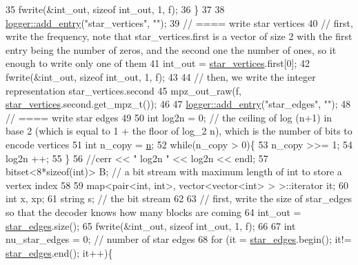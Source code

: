 \begin{DoxyCode}
35     fwrite(&int\_out, \textcolor{keyword}{sizeof} int\_out, 1, f);
36   \}
37 
38   \hyperlink{classlogger_a710163deb17bc81f70d53d285b8ac9ac}{logger::add\_entry}(\textcolor{stringliteral}{"star\_vertices"}, \textcolor{stringliteral}{""});
39   \textcolor{comment}{// ==== write star vertices}
40   \textcolor{comment}{// first, write the frequency, note that star\_vertices.first is a vector of size 2 with the first entry
       being the number of zeros, and the second one the number of ones, so it enough to write only one of them}
41   int\_out = \hyperlink{classmarked__graph__compressed_a7a4ced4586e2e353f9076bd447df5208}{star\_vertices}.first[0];
42   fwrite(&int\_out, \textcolor{keyword}{sizeof} int\_out, 1, f);
43 
44   \textcolor{comment}{// then, we write the integer representation star\_vertices.second}
45   mpz\_out\_raw(f, \hyperlink{classmarked__graph__compressed_a7a4ced4586e2e353f9076bd447df5208}{star\_vertices}.second.get\_mpz\_t());
46 
47   \hyperlink{classlogger_a710163deb17bc81f70d53d285b8ac9ac}{logger::add\_entry}(\textcolor{stringliteral}{"star\_edges"}, \textcolor{stringliteral}{""});
48   \textcolor{comment}{// ==== write star edges}
49 
50   \textcolor{keywordtype}{int} log2n = 0; \textcolor{comment}{// the ceiling of log (n+1) in base 2 (which is equal to 1 + the floor of log\_2 n), which
       is the number of bits to encode vertices}
51   \textcolor{keywordtype}{int} n\_copy = \hyperlink{classmarked__graph__compressed_a8d841016ddb11cfd33748c8deb6277ba}{n};
52   \textcolor{keywordflow}{while}(n\_copy > 0)\{
53     n\_copy >>= 1;
54     log2n ++;
55   \}
56   \textcolor{comment}{//cerr << " log2n " << log2n << endl;}
57   bitset<8*sizeof(int)> B; \textcolor{comment}{// a bit stream with maximum length of int to store a vertex index}
58 
59   map<pair<int, int>, vector<vector<int> > >::iterator it;
60   \textcolor{keywordtype}{int} x, xp;
61   \textcolor{keywordtype}{string} s; \textcolor{comment}{// the bit stream}
62 
63   \textcolor{comment}{// first, write the size of star\_edges so that the decoder knows how many blocks are coming}
64   int\_out = \hyperlink{classmarked__graph__compressed_a7df5779d313486644132bd816937f532}{star\_edges}.size();
65   fwrite(&int\_out, \textcolor{keyword}{sizeof} int\_out, 1, f);
66 
67   \textcolor{keywordtype}{int} nu\_star\_edges = 0; \textcolor{comment}{// number of star edges }
68   \textcolor{keywordflow}{for} (it = \hyperlink{classmarked__graph__compressed_a7df5779d313486644132bd816937f532}{star\_edges}.begin(); it!= \hyperlink{classmarked__graph__compressed_a7df5779d313486644132bd816937f532}{star\_edges}.end(); it++)\{

\end{DoxyCode}
